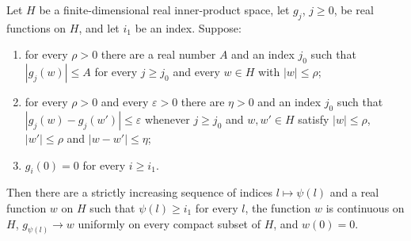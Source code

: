 \begin{lemma}
Let $H$ be a finite-dimensional real inner-product space, let $g_j$, $j\ge0$, be
real functions on $H$, and let $i_1$ be an index. Suppose:
\begin{enumerate}
\item[(i)] for every $\rho>0$ there are a real number $A$ and an index $j_0$ such
that $|g_j(w)|\le A$ for every $j\ge j_0$ and every $w\in H$ with $|w|\le\rho$;
\item[(ii)] for every $\rho>0$ and every $\varepsilon>0$ there are $\eta>0$ and
an index $j_0$ such that $|g_j(w)-g_j(w')|\le\varepsilon$ whenever $j\ge j_0$ and
$w,w'\in H$ satisfy $|w|\le\rho$, $|w'|\le\rho$ and $|w-w'|\le\eta$;
\item[(iii)] $g_i(0)=0$ for every $i\ge i_1$.
\end{enumerate}
Then there are a strictly increasing sequence of indices $l\mapsto\psi(l)$ and a
real function $w$ on $H$ such that $\psi(l)\ge i_1$ for every $l$, the function
$w$ is continuous on $H$, $g_{\psi(l)}\to w$ uniformly on every compact subset of
$H$, and $w(0)=0$.
\end{lemma}
